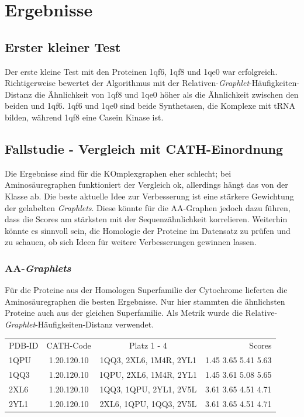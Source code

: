 \documentclass{report}
\begin{document}
\chapter{Ergebnisse}

\section{Erster kleiner Test}

Der erste kleine Test mit den Proteinen 1qf6, 1qf8 und 1qe0 war erfolgreich. Richtigerweise bewertet der Algorithmus mit der Relativen-\textit{Graphlet}-H\"aufigkeiten-Distanz die \"Ahnlichkeit von 1qf8 und 1qe0 h\"oher als die \"Ahnlichkeit zwischen den beiden und 1qf6. 1qf6 und 1qe0 sind beide Synthetasen, die Komplexe mit tRNA bilden, w\"ahrend 1qf8 eine Casein Kinase ist. 

\section{Fallstudie - Vergleich mit CATH-Einordnung}

Die Ergebnisse sind f\"ur die KOmplexgraphen eher schlecht; bei Aminos\"auregraphen funktioniert der Vergleich ok, allerdings h\"angt das von der Klasse ab.
Die beste aktuelle Idee zur Verbesserung ist eine st\"arkere Gewichtung der gelabelten \textit{Graphlets}. Diese k\"onnte f\"ur die AA-Graphen jedoch dazu f\"uhren, dass die Scores am st\"arksten mit der Sequenz\"ahnlichkeit korrelieren.
Weiterhin k\"onnte es sinnvoll sein, die Homologie der Proteine im Datensatz zu pr\"ufen und zu schauen, ob sich Ideen f\"ur weitere Verbesserungen gewinnen lassen.



\subsection{AA-\textit{Graphlets}}

F\"ur die Proteine aus der Homologen Superfamilie der Cytochrome lieferten die Aminos\"auregraphen die besten Ergebnisse.
Nur hier stammten die \"ahnlichsten Proteine auch aus der gleichen Superfamilie.
Als Metrik wurde die Relative-\textit{Graphlet}-H\"aufigkeiten-Distanz verwendet.

\begin{tabular}{l c c r}

PDB-ID & CATH-Code   & Platz 1 - 4            & Scores             \\
1QPU   & 1.20.120.10 & 1QQ3, 2XL6, 1M4R, 2YL1 & 1.45 3.65 5.41 5.63 \\
1QQ3   & 1.20.120.10 & 1QPU, 2XL6, 1M4R, 2YL1 & 1.45 3.61 5.08 5.65 \\
2XL6   & 1.20.120.10 & 1QQ3, 1QPU, 2YL1, 2V5L & 3.61 3.65 4.51 4.71 \\
2YL1   & 1.20.120.10 & 2XL6, 1QPU, 1QQ3, 2V5L & 3.61 3.65 4.51 4.71 \\
\end{tabular}
\end{document}
